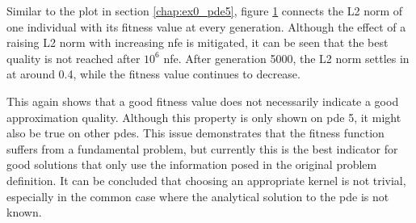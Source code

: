 \documentclass[./\jobname.tex]{subfiles}
\begin{document}
Similar to the plot in section \ref{chap:ex0_pde5}, figure \ref{fig:ex3_pde5_gsk_fit_vs_l2} connects the L2 norm of one individual with its fitness value at every generation. Although the effect of a raising L2 norm with increasing \gls{nfe} is mitigated, it can be seen that the best quality is not reached after $10^6$ \gls{nfe}. After generation 5000, the L2 norm settles in at around 0.4, while the fitness value continues to decrease. 
\begin{figure}[h]
	\centering
	\noindent{}
		\label{fig:ex3_pde5_gsk_fit_vs_l2}
\end{figure}
This again shows that a good fitness value does not necessarily indicate a good approximation quality. Although this property is only shown on \gls{pde} 5, it might also be true on other \gls{pde}s. This issue demonstrates that the fitness function suffers from a fundamental problem, but currently this is the best indicator for good solutions that only use the information posed in the original problem definition. It can be concluded that choosing an appropriate kernel is not trivial, especially in the common case where the analytical solution to the \gls{pde} is not known.  
\end{document}
